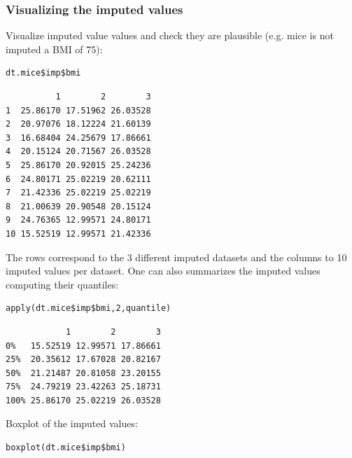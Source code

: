 \documentclass[12pt]{article}
\begin{document}
\subsubsection{Visualizing the imputed values}
\label{sec:org9da41d7}
Visualize imputed value values and check they are plausible (e.g. mice
is not imputed a BMI of 75):
\lstset{language=r,label= ,caption= ,captionpos=b,numbers=none}
\begin{lstlisting}
dt.mice$imp$bmi
\end{lstlisting}

\begin{verbatim}
          1        2        3
1  25.86170 17.51962 26.03528
2  20.97076 18.12224 21.60139
3  16.68404 24.25679 17.86661
4  20.15124 20.71567 26.03528
5  25.86170 20.92015 25.24236
6  24.80171 25.02219 20.62111
7  21.42336 25.02219 25.02219
8  21.00639 20.90548 20.15124
9  24.76365 12.99571 24.80171
10 15.52519 12.99571 21.42336
\end{verbatim}

The rows correspond to the 3 different imputed datasets and the
columns to 10 imputed values per dataset. One can also summarizes the
imputed values computing their quantiles:

\lstset{language=r,label= ,caption= ,captionpos=b,numbers=none}
\begin{lstlisting}
apply(dt.mice$imp$bmi,2,quantile)
\end{lstlisting}

\begin{verbatim}
            1        2        3
0%   15.52519 12.99571 17.86661
25%  20.35612 17.67028 20.82167
50%  21.21487 20.81058 23.20155
75%  24.79219 23.42263 25.18731
100% 25.86170 25.02219 26.03528
\end{verbatim}

Boxplot of the imputed values:

\lstset{language=r,label= ,caption= ,captionpos=b,numbers=none}
\begin{lstlisting}
boxplot(dt.mice$imp$bmi)
\end{lstlisting}
\end{document}
